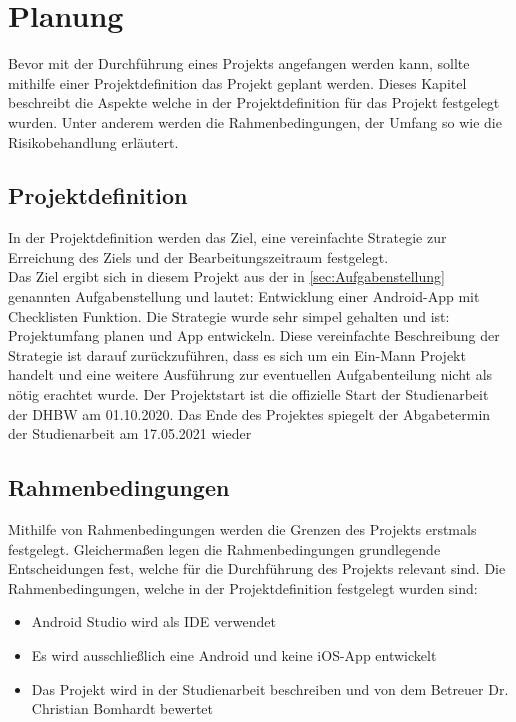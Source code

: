 \chapter{Planung} \label{chpt:planung}

Bevor mit der Durchführung eines Projekts angefangen werden kann, sollte mithilfe einer Projektdefinition das Projekt geplant werden. Dieses Kapitel beschreibt die Aspekte welche in der Projektdefinition für das Projekt festgelegt wurden. Unter anderem werden die Rahmenbedingungen, der Umfang so wie die Risikobehandlung erläutert.

\section{Projektdefinition}\label{sec:projektdef}
In der Projektdefinition werden das Ziel, eine vereinfachte Strategie zur Erreichung des Ziels und der Bearbeitungszeitraum festgelegt.\\
Das Ziel ergibt sich in  diesem Projekt aus der in \autoref{sec:Aufgabenstellung} genannten Aufgabenstellung und lautet: \glqq Entwicklung einer Android-App mit Checklisten Funktion\grqq.
Die Strategie wurde sehr simpel gehalten und ist: \glqq Projektumfang planen und App entwickeln\grqq. Diese vereinfachte Beschreibung der Strategie ist darauf zurückzuführen, dass es sich um ein Ein-Mann Projekt handelt und eine weitere Ausführung zur eventuellen Aufgabenteilung nicht als nötig erachtet wurde.
Der Projektstart ist die offizielle Start der Studienarbeit der \ac{DHBW} am 01.10.2020. Das Ende des Projektes spiegelt der Abgabetermin der Studienarbeit am 17.05.2021 wieder

\section{Rahmenbedingungen}\label{sec:rehamen}
Mithilfe von Rahmenbedingungen werden die Grenzen des Projekts erstmals festgelegt. Gleichermaßen legen die Rahmenbedingungen grundlegende Entscheidungen fest, welche für die Durchführung des Projekts relevant sind. Die Rahmenbedingungen, welche in der Projektdefinition festgelegt wurden sind:

\begin{itemize}
	\item Android Studio wird als \ac{IDE} verwendet
	\item Es wird ausschließlich eine Android und keine iOS-App entwickelt
	\item Das Projekt wird in der Studienarbeit beschreiben und von dem Betreuer Dr. Christian Bomhardt bewertet
\end{itemize}

